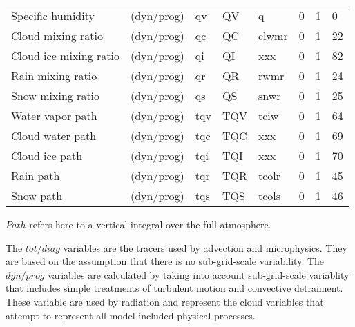 \documentclass[a4paper,11pt,landscape,notitlepage]{article}
\begin{document}
\begin{centering}
\begin{tabular}{l l l l l l l l}
\hline                                                                                                                                                         
Specific humidity      &  (dyn/prog)   &  qv                     &  QV                    &  q                       &  0                  &     1             &        0   \\
Cloud mixing ratio     &  (dyn/prog)   &  qc                     &  QC                    &  clwmr                   &  0                  &     1             &        22  \\
Cloud ice mixing ratio &  (dyn/prog)   &  qi                     &  QI                    &  xxx                     &  0                  &     1             &        82  \\
Rain mixing ratio      &  (dyn/prog)   &  qr                     &  QR                    &  rwmr                    &  0                  &     1             &        24  \\
Snow mixing ratio      &  (dyn/prog)   &  qs                     &  QS                    &  snwr                    &  0                  &     1             &        25  \\
Water vapor path       &  (dyn/prog)   &  tqv                    &  TQV                   &  tciw                    &  0                  &     1             &        64  \\
Cloud water path       &  (dyn/prog)   &  tqc                    &  TQC                   &  xxx                     &  0                  &     1             &        69  \\
Cloud ice path         &  (dyn/prog)   &  tqi                    &  TQI                   &  xxx                     &  0                  &     1             &        70  \\
Rain path              &  (dyn/prog)   &  tqr                    &  TQR                   &  tcolr                   &  0                  &     1             &        45  \\
Snow path              &  (dyn/prog)   &  tqs                    &  TQS                   &  tcols                   &  0                  &     1             &        46  \\
\hline
\end{tabular}
\end{centering}


$Path$ refers here to a vertical integral over the full atmosphere. 

The $tot/diag$ variables are the tracers used by advection and microphysics.  
They are based on the assumption that there is no sub-grid-scale variability.  The $dyn/prog$ variables are calculated by taking into account 
sub-grid-scale variablity that includes simple treatments of turbulent motion and convective detraiment.  These variable are used by radiation and 
represent the cloud variables that attempt to represent all model included physical processes.
\end{document}
